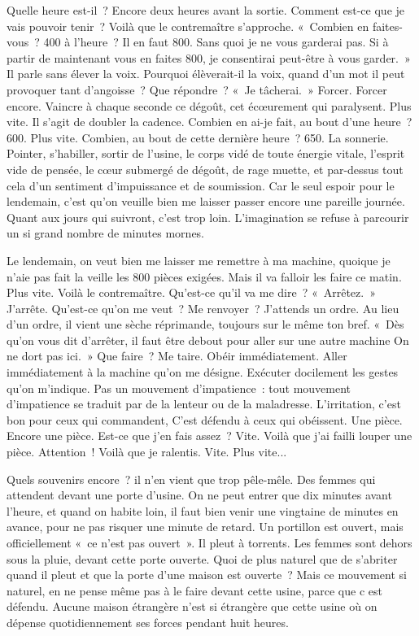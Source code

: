 \documentclass[french,twoside]{book} %
\begin{document}
Quelle heure est-il ? Encore deux heures avant la sortie. Comment est-ce que je vais pouvoir tenir ? Voilà que le contremaître s'approche. « Combien en faites-vous ? 400 à l'heure ? Il en faut 800. Sans quoi je ne vous garderai pas. Si à partir de maintenant vous en faites 800, je consentirai peut-être à vous garder. » Il parle sans élever la voix. Pourquoi élèverait-il la voix, quand d'un mot il peut provoquer tant d'angoisse ? Que répondre ? « Je tâcherai. » Forcer. Forcer encore. Vaincre à chaque seconde ce dégoût, cet écœurement qui paralysent. Plus vite. Il s'agit de doubler la cadence. Combien en ai-je fait, au bout d'une heure ? 600. Plus vite. Combien, au bout de cette dernière heure ? 650. La sonnerie. Pointer, s'habiller, sortir de l'usine, le corps vidé de toute énergie vitale, l'esprit vide de pensée, le cœur submergé de dégoût, de rage muette, et par-dessus tout cela d'un sentiment d'impuissance et de soumission. Car le seul espoir pour le lendemain, c'est qu'on veuille bien me laisser passer encore une pareille journée. Quant aux jours qui suivront, c'est trop loin. L'imagination se refuse à parcourir un si grand nombre de minutes mornes.\par
Le lendemain, on veut bien me laisser me remettre à ma machine, quoique je n'aie pas fait la veille les 800 pièces exigées. Mais il va falloir les faire ce matin. Plus vite. Voilà le contremaître. Qu'est-ce qu'il va me dire ? « Arrêtez. » J'arrête. Qu'est-ce qu'on me veut ? Me renvoyer ? J'attends un ordre. Au lieu d'un ordre, il vient une sèche réprimande, toujours sur le même ton bref. « Dès qu'on vous dit d'arrêter, il faut être debout pour aller sur une autre machine On ne dort pas ici. » Que faire ? Me taire. Obéir immédiatement. Aller immédiatement à la machine qu’on me désigne. Exécuter docilement les gestes qu'on m’indique. Pas un mouvement d’impatience : tout mouvement d’impatience se traduit par de la lenteur ou de la maladresse. L'irritation, c'est bon pour ceux qui commandent, C'est défendu à ceux qui obéissent. Une pièce. Encore une pièce. Est-ce que j'en fais assez ? Vite. Voilà que j'ai failli louper une pièce. Attention ! Voilà que je ralentis. Vite. Plus vite...\par
Quels souvenirs encore ? il n'en vient que trop pêle-mêle. Des femmes qui attendent devant une porte d'usine. On ne peut entrer que dix minutes avant l'heure, et quand on habite loin, il faut bien venir une vingtaine de minutes en avance, pour ne pas risquer une minute de retard. Un portillon est ouvert, mais officiellement « ce n'est pas ouvert ». Il pleut à torrents. Les femmes sont dehors sous la pluie, devant cette porte ouverte. Quoi de plus naturel que de s'abriter quand il pleut et que la porte d'une maison est ouverte ? Mais ce mouvement si naturel, en ne pense même pas à le faire devant cette usine, parce que c est défendu. Aucune maison étrangère n’est si étrangère que cette usine où on dépense quotidiennement ses forces pendant huit heures.\par
\end{document}
